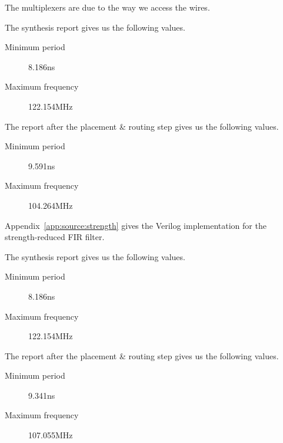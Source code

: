 The multiplexers are due to the way we access the wires.

The synthesis report gives us the following values.
\begin{description}
	\item[Minimum period] 8.186ns
	\item[Maximum frequency] 122.154MHz
\end{description}

The report after the placement \& routing step gives us the following values.
\begin{description}
	\item[Minimum period] 9.591ns
	\item[Maximum frequency] 104.264MHz
\end{description}

\strengthfilter
Appendix~\ref{app:source:strength} gives the Verilog implementation for the strength-reduced FIR filter.

The synthesis report gives us the following values.
\begin{description}
	\item[Minimum period] 8.186ns
	\item[Maximum frequency] 122.154MHz
\end{description}

The report after the placement \& routing step gives us the following values.
\begin{description}
	\item[Minimum period] 9.341ns
	\item[Maximum frequency] 107.055MHz
\end{description}

